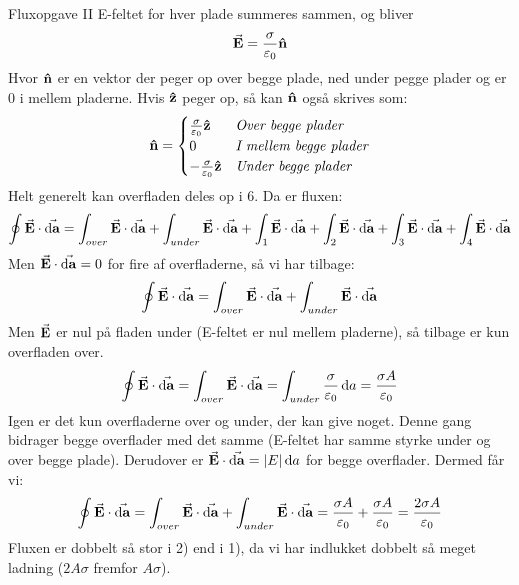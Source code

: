 \documentclass[crop=false, class=memoir]{standalone}
\begin{document}
\begin{opgave}{Fluxopgave II}
    \opg
    E-feltet for hver plade summeres sammen, og bliver 
    \begin{align*}
        \va{E}=\frac{\sigma}{\varepsilon_0}\vu{n}
    \end{align*}
    Hvor $\vu{n}$ er en vektor der peger op over begge plade, ned under pegge plader og er 0 i mellem pladerne. Hvis $\vu{z}$ peger op, så kan $\vu{n}$ også skrives som:
    \begin{align*}
        \vu{n}=\begin{cases} 
      \frac{\sigma}{\varepsilon_0}\vu{z} & \textit{Over begge plader} \\
      0 & \textit{I mellem begge plader} \\
      -\frac{\sigma}{\varepsilon_0}\vu{z} & \textit{Under begge plader}
   \end{cases}
    \end{align*}
    \opg
    Helt generelt kan overfladen deles op i 6. Da er fluxen:
    \begin{align*}
        \oint\va{E}\cdot\va{\dd{a}}=\int_{over}\va{E}\cdot\va{\dd{a}}+\int_{under}\va{E}\cdot\va{\dd{a}}+\int_1\va{E}\cdot\va{\dd{a}}+\int_2\va{E}\cdot\va{\dd{a}}+\int_3\va{E}\cdot\va{\dd{a}}+\int_4\va{E}\cdot\va{\dd{a}}
    \end{align*}
    Men $\va{E}\cdot\va{\dd{a}}=0$ for fire af overfladerne, så vi har tilbage:
    \begin{align*}
        \oint\va{E}\cdot\va{\dd{a}}=\int_{over}\va{E}\cdot\va{\dd{a}}+\int_{under}\va{E}\cdot\va{\dd{a}}
    \end{align*}
    Men $\va{E}$ er nul på fladen under (E-feltet er nul mellem pladerne), så tilbage er kun overfladen over.
    \begin{align*}
        \oint\va{E}\cdot\va{\dd{a}}=\int_{over}\va{E}\cdot\va{\dd{a}}=\int_{under}\frac{\sigma}{\varepsilon_0}\dd{a}=\frac{\sigma A}{\varepsilon_0}
    \end{align*}
    \opg
    Igen er det kun overfladerne over og under, der kan give noget. Denne gang bidrager begge overflader med det samme (E-feltet har samme styrke under og over begge plade). Derudover er $\va{E}\cdot\va{\dd{a}}=|E|\dd{a}$ for begge overflader. Dermed får vi:
    \begin{align*}
        \oint\va{E}\cdot\va{\dd{a}}=\int_{over}\va{E}\cdot\va{\dd{a}}+\int_{under}\va{E}\cdot\va{\dd{a}}=\frac{\sigma A}{\varepsilon_0}+\frac{\sigma A}{\varepsilon_0}=\frac{2\sigma A}{\varepsilon_0}
    \end{align*}
    \opg
    Fluxen er dobbelt så stor i 2) end i 1), da vi har indlukket dobbelt så meget ladning ($2A\sigma$ fremfor $A\sigma$).
    
\end{opgave}
\end{document}
